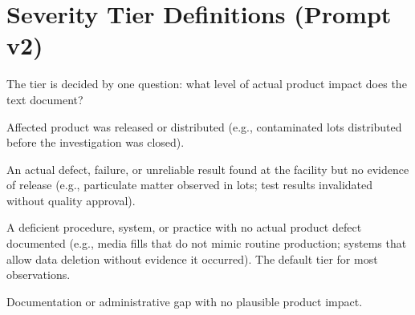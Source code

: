 \documentclass[12pt]{article}
\begin{document}
\section{Severity Tier Definitions (Prompt v2)}
\label{app:severity}

The tier is decided by one question: what level of actual product impact
does the text document?

\begin{description}[leftmargin=2em]
  \item[Critical] Affected product was released or distributed (e.g.,
    contaminated lots distributed before the investigation was closed).
  \item[Major] An actual defect, failure, or unreliable result found at the
    facility but no evidence of release (e.g., particulate matter observed
    in lots; test results invalidated without quality approval).
  \item[Moderate] A deficient procedure, system, or practice with no actual
    product defect documented (e.g., media fills that do not mimic routine
    production; systems that allow data deletion without evidence it
    occurred). The default tier for most observations.
  \item[Minor] Documentation or administrative gap with no plausible product
    impact.
\end{description}
\end{document}
